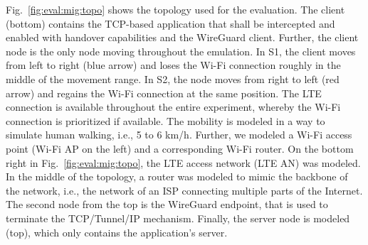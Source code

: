 Fig.~\ref{fig:eval:mig:topo} shows the topology used for the evaluation.
The client (bottom) contains the TCP-based application that shall be intercepted and enabled with handover capabilities and the WireGuard client.
Further, the client node is the only node moving throughout the emulation.
In S1, the client moves from left to right (blue arrow) and loses the Wi-Fi connection roughly in the middle of the movement range. 
In S2, the node moves from right to left (red arrow) and regains the Wi-Fi connection at the same position.
The LTE connection is available throughout the entire experiment, whereby the Wi-Fi connection is prioritized if available.
The mobility is modeled in a way to simulate human walking, i.e., 5 to 6 km/h.
Further, we modeled a Wi-Fi access point (Wi-Fi AP on the left) and a corresponding Wi-Fi router.
On the bottom right in Fig.~\ref{fig:eval:mig:topo}, the LTE access network (LTE AN) was modeled.
In the middle of the topology, a router was modeled to mimic the backbone of the network, i.e., the network of an ISP connecting multiple parts of the Internet.
The second node from the top is the WireGuard endpoint, that is used to terminate the TCP/Tunnel/IP mechanism.
Finally, the server node is modeled (top), which only contains the application's server.


